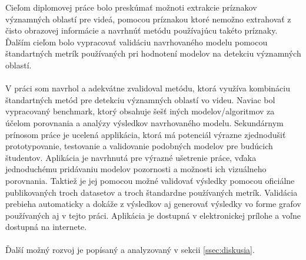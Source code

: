 Cieľom diplomovej práce bolo preskúmať možnoti extrakcie príznakov významných oblastí pre videá, pomocou príznakou ktoré nemožno extrahovať z čisto obrazovej informácie a navrhnúť metódu používajúcu takéto príznaky.
Ďalším cieľom bolo vypracovať validáciu navrhovaného modelu pomocou štandartných metrík používaných pri hodnotení modelov na detekciu významných oblastí.
\\
\\
V práci som navrhol a adekvátne zvalidoval metódu, ktorá využíva kombináciu štandartných metód pre detekciu významných oblastí vo videu.
Naviac bol vypracovaný benchmark, ktorý obsahuje šešť iných modelov/algoritmov za účelom porovnania a analýzy výsledkov navrhovaného modelu.
Sekundárnym prínosom práce je ucelená applikácia, ktorá má potenciál výrazne zjednodušiť prototypovanie, testovanie a validovanie podobných modelov pre budúcich študentov.
Aplikácia je navrhnutá pre výrazné ušetrenie práce, vďaka jednoduchému pridávaniu modelov pozornosti a možnosti ich vizuálneho porovnania.
Taktiež je jej pomocou možné validovať výsledky pomocou oficiálne publikovaných troch datasetov a troch štandardne používaných metrík.
Validácia prebieha automaticky a dokáže z výsledkov aj generovať výsledky vo forme grafov používaných aj v tejto práci.
Aplikácia je dostupná v elektronickej prílohe a voľne dostupná na internete. 
\\
\\
Ďalší možný rozvoj je popísaný a analyzovaný v sekcii \ref{ssec:diskusia}.
